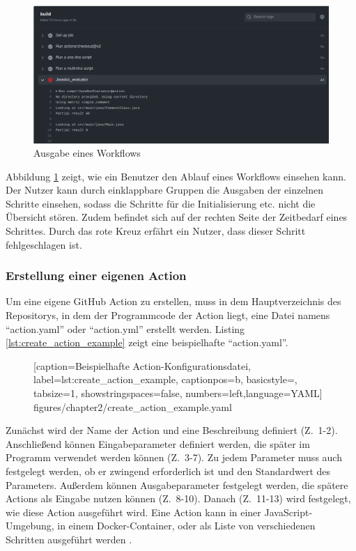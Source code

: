 \begin{figure}[ht!]
    \centering
    \includegraphics[width=0.9\columnwidth]{figures/chapter2/workflow_output.png}
    \caption{Ausgabe eines Workflows}
    \label{fig:workflow_output}
\end{figure}

Abbildung \ref{fig:workflow_output} zeigt, wie ein Benutzer den Ablauf eines Workflows einsehen kann. Der Nutzer kann durch einklappbare Gruppen die Ausgaben der einzelnen Schritte einsehen, sodass die Schritte für die Initialisierung etc. nicht die Übersicht stören. Zudem befindet sich auf der rechten Seite der Zeitbedarf eines Schrittes. Durch das rote Kreuz erfährt ein Nutzer, dass dieser Schritt fehlgeschlagen ist. 


\subsubsection{Erstellung einer eigenen Action}
Um eine eigene GitHub Action zu erstellen, muss in dem Hauptverzeichnis des Repositorys, in dem der Programmcode der Action liegt, eine Datei namens \enquote{action.yaml} oder \enquote{action.yml} erstellt werden. Listing \ref{lst:create_action_example} zeigt eine beispielhafte \enquote{action.yaml}.
	\begin{figure}[h!]
			
			[caption={Beispielhafte Action-Konfigurationsdatei},
			label={lst:create_action_example},
			captionpos=b, basicstyle=\footnotesize, tabsize=1, showstringspaces=false,  numbers=left,language=YAML]
			{figures/chapter2/create_action_example.yaml}
		\end{figure}
Zunächst wird der Name der Action und eine Beschreibung definiert (Z.~1-2). Anschließend können Eingabeparameter definiert werden, die später im Programm verwendet werden können (Z.~3-7). Zu jedem Parameter muss auch festgelegt werden, ob er zwingend erforderlich ist und den Standardwert des Parameters. Außerdem können Ausgabeparameter festgelegt werden, die spätere Actions als Eingabe nutzen können (Z.~8-10). Danach (Z.~11-13) wird festgelegt, wie diese Action ausgeführt wird. Eine Action kann in einer JavaScript-Umgebung, in einem Docker-Container, oder als Liste von verschiedenen Schritten ausgeführt werden \cite[S.~117ff.]{github_action_book}. 


